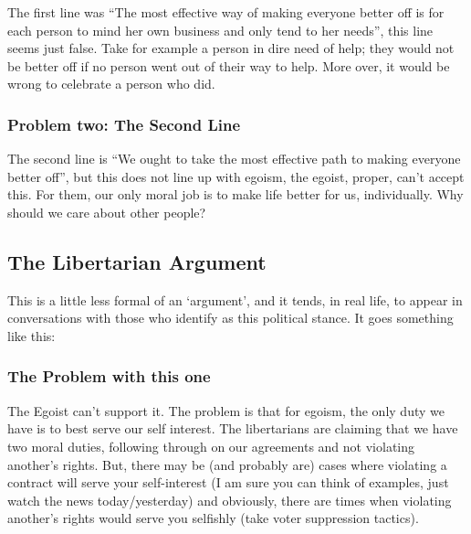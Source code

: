 The first line was “The most effective way of making everyone better off is for each person to mind her own business and only tend to her needs”, this line seems just false. Take for example a person in dire need of help; they would not be better off if no person went out of their way to help. More over, it would be wrong to celebrate a person who did.

\subsubsection{Problem two: The Second Line}

The second line is “We ought to take the most effective path to making everyone better off”, but this does not line up with egoism, the egoist, proper, can’t accept this. For them, our only moral job is to make life better for us, individually. Why should we care about other people?

\subsection{The Libertarian Argument}

This is a little less formal of an ‘argument’, and it tends, in real life, to appear in conversations with those who identify as this political stance. It goes something like this:


\subsubsection{The Problem with this one}

The Egoist can’t support it. The problem is that for egoism, the only duty we have is to best serve our self interest. The libertarians are claiming that we have two moral duties, following through on our agreements and not violating another’s rights. But, there may be (and probably are) cases where violating a contract will serve your self-interest (I am sure you can think of examples, just watch the news today/yesterday) and obviously, there are times when violating another’s rights would serve you selfishly (take voter suppression tactics).

